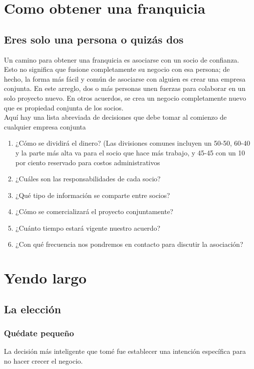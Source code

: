 \documentclass[10pt]{book}
\begin{document}
    \chapter{Como obtener una franquicia}
	\section{Eres solo una persona o quizás dos}
	    Un camino para obtener una franquicia es asociarse con un socio de confianza. Esto no significa que fusione completamente su negocio con esa persona; de hecho, la forma más fácil y común de asociarse con alguien es crear una empresa conjunta. En este arreglo, dos o más personas unen fuerzas para colaborar en un solo proyecto nuevo. En otros acuerdos, se crea un negocio completamente nuevo que es propiedad conjunta de los socios.\\
	    Aquí hay una lista abreviada de decisiones que debe tomar al comienzo de cualquier empresa conjunta
	    \begin{enumerate}
		    \item ¿Cómo se dividirá el dinero? (Las divisiones comunes incluyen un 50-50, 60-40 y la parte más alta va para el socio que hace más trabajo, y 45-45 con un 10 por ciento reservado para costos administrativos
		    \item ¿Cuáles son las responsabilidades de cada socio?
		    \item ¿Qué tipo de información se comparte entre socios?
		    \item ¿Cómo se comercializará el proyecto conjuntamente?
		    \item ¿Cuánto tiempo estará vigente nuestro acuerdo?
		    \item ¿Con qué frecuencia nos pondremos en contacto para discutir la asociación?
	    \end{enumerate}

    \chapter{Yendo largo}
	\section{La elección}
	    \subsection{Quédate pequeño}
		La decisión más inteligente que tomé fue establecer una intención específica para no hacer crecer el negocio.
\end{document}
